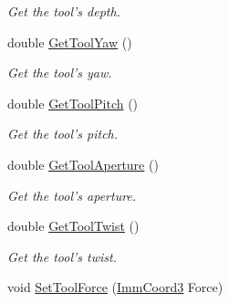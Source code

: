 \begin{DoxyCompactItemize}
\begin{DoxyCompactList}\small\item\em Get the tool's depth. \item\end{DoxyCompactList}\item 
\hypertarget{classvtkLSWTool_a87fba85ba3b19ca11756b9f02ee11ec5}{
double \hyperlink{classvtkLSWTool_a87fba85ba3b19ca11756b9f02ee11ec5}{GetToolYaw} ()}
\label{classvtkLSWTool_a87fba85ba3b19ca11756b9f02ee11ec5}

\begin{DoxyCompactList}\small\item\em Get the tool's yaw. \item\end{DoxyCompactList}\item 
\hypertarget{classvtkLSWTool_ac1535996d9940b4682b00220b04f54ad}{
double \hyperlink{classvtkLSWTool_ac1535996d9940b4682b00220b04f54ad}{GetToolPitch} ()}
\label{classvtkLSWTool_ac1535996d9940b4682b00220b04f54ad}

\begin{DoxyCompactList}\small\item\em Get the tool's pitch. \item\end{DoxyCompactList}\item 
\hypertarget{classvtkLSWTool_aeac007db90b616758b85cd6dbddd7d3b}{
double \hyperlink{classvtkLSWTool_aeac007db90b616758b85cd6dbddd7d3b}{GetToolAperture} ()}
\label{classvtkLSWTool_aeac007db90b616758b85cd6dbddd7d3b}

\begin{DoxyCompactList}\small\item\em Get the tool's aperture. \item\end{DoxyCompactList}\item 
\hypertarget{classvtkLSWTool_abfc8ab200e2ce7d66a38a3ce18542e98}{
double \hyperlink{classvtkLSWTool_abfc8ab200e2ce7d66a38a3ce18542e98}{GetToolTwist} ()}
\label{classvtkLSWTool_abfc8ab200e2ce7d66a38a3ce18542e98}

\begin{DoxyCompactList}\small\item\em Get the tool's twist. \item\end{DoxyCompactList}\item 
\hypertarget{classvtkLSWTool_acdbab04fdd62c6d0970b5e5e78069ee5}{
void \hyperlink{classvtkLSWTool_acdbab04fdd62c6d0970b5e5e78069ee5}{SetToolForce} (\hyperlink{structImmCoord3}{ImmCoord3} Force)}
\label{classvtkLSWTool_acdbab04fdd62c6d0970b5e5e78069ee5}


\end{DoxyCompactItemize}
